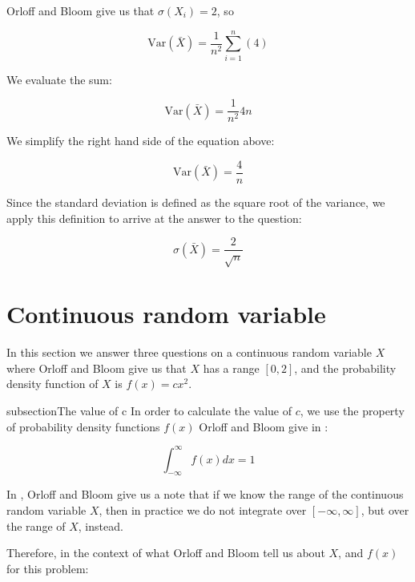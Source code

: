 \documentclass[a4paper,11pt]{article}
\begin{document}
Orloff and Bloom give us that $\sigma(X_{i})=2$, so

\begin{equation}
\text{Var}\left( \bar{X} \right)
  = \frac{1}{n^{2}} \sum_{i=1}^{n} \left( 4 \right)
\end{equation}

We evaluate the sum:

\begin{equation}
\text{Var}\left( \bar{X} \right)
  = \frac{1}{n^{2}} 4n
\end{equation}

We simplify the right hand side of the equation above:

\begin{equation}
\text{Var}\left( \bar{X} \right)
  =  \frac{4}{n}
\end{equation}

Since the standard deviation is defined as the square root of the variance, we
apply this definition to arrive at the answer to the question:

\begin{equation}
\sigma \left( \bar{X} \right)
  =  \frac{2}{\sqrt{n}}
\end{equation}

\section{Continuous random variable}
In this section we answer three questions on a continuous random variable $X$
where Orloff and Bloom give us that $X$ has a range $\left[ 0, 2 \right]$, and
the probability density function of $X$ is $f \left( x \right) = cx^{2}$.

subsection{The value of c}
In order to calculate the value of $c$, we use the property of probability
density functions $f\left(x \right)$ Orloff and Bloom give in \cite{reading5b}:

\begin{equation}
  \int_{-\infty}^{\infty} f \left( x \right) dx = 1
\end{equation}

In \cite{reading5b}, Orloff and Bloom give us a note that if we know the range
of the continuous random variable $X$, then in practice we do not integrate
over $\left[ -\infty, \infty \right]$, but over the range of $X$, instead.

Therefore, in the context of what Orloff and Bloom tell us about $X$, and
$f \left(  x \right)$ for this problem:
\end{document}
